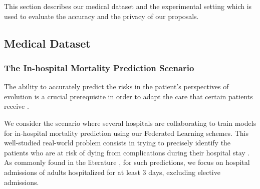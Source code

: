 \documentclass[accepted]{uai2021} %
\newcommand{\mbf}[1]{{\mathbf{#1}}}
\begin{document}
This section describes our medical dataset and the experimental setting which is used to evaluate the accuracy and the privacy of our proposals.


\subsection{Medical Dataset}

\label{sec:medical_dataset_desc}

\subsubsection{The In-hospital Mortality Prediction Scenario}

The ability to accurately predict the risks in the patient's perspectives of evolution is a crucial prerequisite in order to adapt the care that certain patients receive \citep{Papier_Amela}.

We consider the scenario where several hospitals are collaborating to train models for in-hospital mortality prediction using
our Federated Learning schemes. 
This well-studied real-world problem consists in trying to precisely identify the patients who are at risk of dying from complications during their hospital stay \citep{Avati2018,rajkomar-npj18,Papier_Amela}. As commonly found in the literature \citep{Papier_Amela}, for such predictions, we focus on hospital admissions of adults hospitalized for at least 3 days, excluding elective admissions. 


\end{document}
